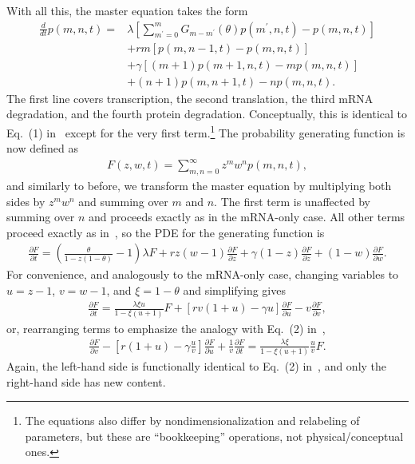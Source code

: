\documentclass[12pt]{article}%
\newcommand{\deriv}[2][{}]{\frac{d #1}{d #2}}
\newcommand{\pderiv}[2][{}]{\frac{\partial #1}{\partial #2}}
\begin{document}
With all this, the master equation takes the form
\begin{align}
\deriv{t}p(m,n,t) = 
        & \lambda \left[\sum_{m^\prime=0}^m G_{m-m^\prime}(\theta) p(m^\prime,n,t)
        - p(m,n,t) \right]
        \\
        & + r m [ p(m,n-1,t) - p(m,n,t) ]
        \\
        & + \gamma [ (m+1) p(m+1,n,t) - m p(m,n,t) ]
        \\
        & + (n+1) p(m,n+1,t) - n p(m,n,t).
\end{align}
The first line covers transcription, the second translation, the third
mRNA degradation, and the fourth protein degradation. Conceptually, this
is identical to Eq.~(1) in~\cite{Shahrezaei2008} except for the very
first term.\footnote{The equations also differ by nondimensionalization
and relabeling of parameters, but these are ``bookkeeping'' operations,
not physical/conceptual ones.}
The probability generating function is now defined as
\begin{align}
F(z,w,t) = \sum_{m,n=0}^\infty z^m w^n p(m,n,t),
\end{align}
and similarly to before, we transform the master equation by multiplying
both sides by $z^m w^n$ and summing over $m$ and $n$.
The first term is unaffected by summing over $n$ and proceeds exactly as
in the mRNA-only case. All other terms proceed exactly as
in~\cite{Shahrezaei2008}, so the PDE for the generating function is
\begin{align}
\pderiv[F]{t} = \left(\frac{\theta}{1-z(1-\theta)}-1\right)\lambda F
        + rz(w - 1) \pderiv[F]{z} + \gamma(1 - z) \pderiv[F]{z}
        + (1 - w) \pderiv[F]{w}.
\end{align}
For convenience, and analogously to the mRNA-only case, changing variables to
$u=z-1$, $v=w-1$, and $\xi=1-\theta$ and simplifying gives
\begin{align}
\pderiv[F]{t} = \frac{\lambda\xi u}{1-\xi(u+1)} F
        + \left[ rv(1+u) - \gamma u \right] \pderiv[F]{u}
        - v \pderiv[F]{v},
\end{align}
or, rearranging terms to emphasize the analogy with
Eq.~(2) in~\cite{Shahrezaei2008},
\begin{align}
\pderiv[F]{v} - \left[ r(1+u) - \gamma \frac{u}{v} \right] \pderiv[F]{u} 
        + \frac{1}{v}\pderiv[F]{t} = \frac{\lambda\xi}{1-\xi(u+1)} \frac{u}{v} F.
\end{align}
Again, the left-hand side is functionally identical to Eq.~(2)
in~\cite{Shahrezaei2008}, and only the right-hand side has new content.
\end{document}
